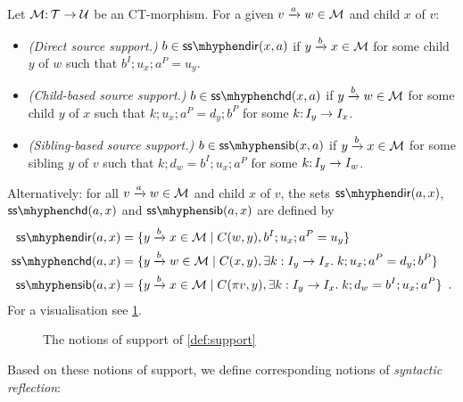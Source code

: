 \begin{definition}\label{def:support}
Let ${\mathcal{M}}{:}\, {\mathcal{T}}\rightarrow{\mathcal{U}}$ be an CT-morphism. For a given ${v}\xrightarrow{a}{w}\in{\mathcal{M}}$ and child $x$ of $v$:
\begin{itemize}[topsep=\smallskipamount]
\item \emph{(Direct source support.)} $\issdir b{x,a}$ if ${y}\xrightarrow{b}{x}\in{\mathcal{M}}$ for some child $y$ of $w$ such that $b^I;u_x;a^P=u_y$.
\item \emph{(Child-based source support.)} $\isschd b{x,a}$ if ${y}\xrightarrow{b}{w}\in{\mathcal{M}}$ for some child $y$ of $x$ such that $k;u_x;a^P=d_y;b^P$ for some $k{:}\, I_y\rightarrow I_x$.
\item \emph{(Sibling-based source support.)} $\isssib b{x,a}$ if ${y}\xrightarrow{b}{x}\in{\mathcal{M}}$ for some sibling $y$ of $v$ such that $k;d_w=b^I;u_x;a^P$ for some $k{:}\, I_y\rightarrow I_w$.
\end{itemize}
\end{definition}
%
Alternatively: for all ${v}\xrightarrow{a}{w}\in{\mathcal{M}}$ and child $x$ of $v$, the sets $\sdir{a,x}$, $\schd{a,x}$ and $\ssib{a,x}$ are defined by
%
\begin{align*}
\sdir{a,x} ={} & \gensetof{\trip ybx\in \cM}{C(w,y), b^I;u_x;a^P=u_y} \\
\schd{a,x} ={} & \gensetof{\trip ybw\in \cM}{C(x,y), \exists k:I_y\to I_x\st k;u_x;a^P=d_y;b^P} \\
\ssib{a,x} ={} & \gensetof{\trip ybx\in \cM}{C(\parentof v,y), \exists k:I_y\to I_x\st k;d_w=b^I;u_x;a^P} \enspace.
\end{align*}
%
For a visualisation see \cref{fig:source-support}.
%
\begin{figure}
	
	\caption{The notions of support of \cref{def:support}}
	\label{fig:source-support}
\end{figure}
%
Based on these notions of support, we define corresponding notions of \emph{syntactic reflection}:

